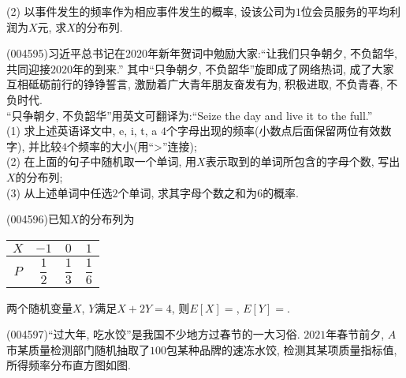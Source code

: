 (2) 以事件发生的频率作为相应事件发生的概率, 设该公司为$1$位会员服务的平均利润为$X$元, 求$X$的分布列.
\item (004595)习近平总书记在$2020$年新年贺词中勉励大家:``让我们只争朝夕, 不负韶华, 共同迎接$2020$年的到来.'' 其中``只争朝夕, 不负韶华''旋即成了网络热词, 成了大家互相砥砺前行的铮铮誓言, 激励着广大青年朋友奋发有为, 积极进取, 不负青春, 不负时代.\\
``只争朝夕, 不负韶华''用英文可翻译为:``Seize the day and live it to the full.''\\
(1) 求上述英语译文中, e, i, t, a $4$个字母出现的频率(小数点后面保留两位有效数字), 并比较$4$个频率的大小(用``>''连接);\\
(2) 在上面的句子中随机取一个单词, 用$X$表示取到的单词所包含的字母个数, 写出$X$的分布列;\\
(3) 从上述单词中任选$2$个单词, 求其字母个数之和为$6$的概率.
\item (004596)已知$X$的分布列为
\begin{center}
    \begin{tabular}{|c|c|c|c|}
        \hline
        $X$ & $-1$ & $0$ & $1$ \\ \hline
        $P$ & $\dfrac 12$ & $\dfrac 13$ & $\dfrac 16$ \\ \hline
    \end{tabular}
\end{center}
两个随机变量$X$, $Y$满足$X+2Y=4$, 则$E[X]=$, $E[Y]=$.
\item (004597)``过大年, 吃水饺''是我国不少地方过春节的一大习俗. $2021$年春节前夕, $A$市某质量检测部门随机抽取了$100$包某种品牌的速冻水饺, 检测其某项质量指标值, 所得频率分布直方图如图.
\begin{center}
\end{center}
